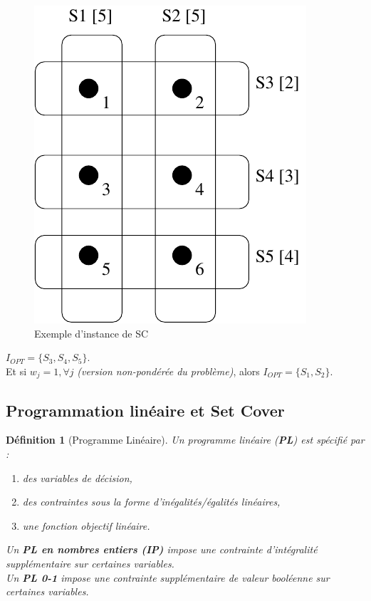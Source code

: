 \documentclass{article}
\newcommand{\titre}[1]{\textcolor{title}{#1}}
\newtheorem{de}{D\'efinition}[section]
\begin{document}
\begin{sffamily}
\begin{figure}[h!]
    \begin{center}
    \includegraphics[scale=0.5]{inst_sc.pdf}
    \caption{Exemple d'instance de \titre{SC}}
    \end{center}
\end{figure}

$I_{OPT} = \{S_3,S_4,S_5\}$. \\
\indent Et si $w_j = 1, \forall j$ \textit{(version non-pondérée du problème)},
alors $I_{OPT} = \{S_1,S_2\}$.

\subsection{Programmation linéaire et Set Cover}

\begin{de}[Programme Linéaire]
Un programme linéaire (\titre{\textbf{PL}}) est spécifié par :
\begin{enumerate}
\item des variables de décision,
\item des contraintes sous la forme d'inégalités/égalités linéaires,
\item une fonction objectif linéaire.
\end{enumerate}
Un \textbf{\titre{PL} en nombres entiers (\titre{IP})} impose une contrainte
d'intégralité supplémentaire sur certaines variables.\\
Un \textbf{\titre{PL} 0-1} impose une contrainte supplémentaire de valeur
booléenne sur certaines variables.\\
\end{de}


\end{sffamily}
\end{document}

